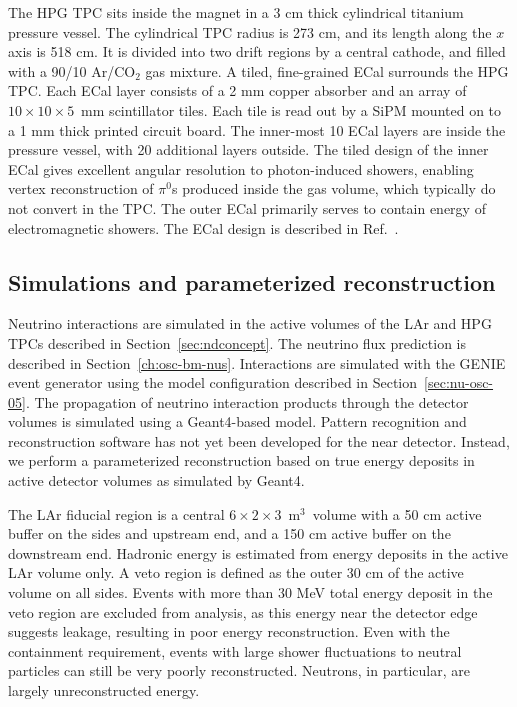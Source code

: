 The HPG TPC sits inside the magnet in a 3 cm thick cylindrical titanium pressure vessel. The cylindrical TPC radius is 273 cm, and its length along the $x$ axis is 518 cm. It is divided into two drift regions by a central cathode, and filled with a 90/10 Ar/CO$_{2}$ gas mixture. A tiled, fine-grained ECal surrounds the HPG TPC. Each ECal layer consists of a 2 mm copper absorber and an array of $10 \times 10 \times 5$~mm scintillator tiles. Each tile is read out by a SiPM mounted on to a 1 mm thick printed circuit board. The inner-most 10 ECal layers are inside the pressure vessel, with 20 additional layers outside. The tiled design of the inner ECal gives excellent angular resolution to photon-induced showers, enabling vertex reconstruction of $\pi^{0}$s produced inside the gas volume, which typically do not convert in the TPC. The outer ECal primarily serves to contain energy of electromagnetic showers. The ECal design is described in Ref.~. 


\subsection{Simulations and parameterized reconstruction}

\label{sec:ndsimreco}

Neutrino interactions are simulated in the active volumes of the LAr and HPG TPCs described in Section~\ref{sec:ndconcept}. The neutrino flux prediction is described in Section~\ref{ch:osc-bm-nus}.%
Interactions are simulated with the GENIE event generator using the model configuration described in Section~\ref{sec:nu-osc-05}. The propagation of neutrino interaction products through the detector volumes is simulated using a Geant4-based model. Pattern recognition and reconstruction software has not yet been developed for the near detector. Instead, we perform a parameterized reconstruction based on true energy deposits in active detector volumes as simulated by Geant4.

The LAr fiducial region is a central $6 \times 2 \times 3$~m$^{3}$~volume with a 50 cm active buffer on the sides and upstream end, and a 150 cm active buffer on the downstream end. Hadronic energy is estimated from energy deposits in the active LAr volume only.  A veto region is defined as the outer 30 cm of the active volume on all sides. Events with more than 30 MeV total energy deposit in the veto region are excluded from analysis, as this energy near the detector edge suggests leakage, resulting in poor energy reconstruction. Even with the containment requirement, events with large shower fluctuations to neutral particles can still be very poorly reconstructed. Neutrons, in particular, are largely unreconstructed energy.

